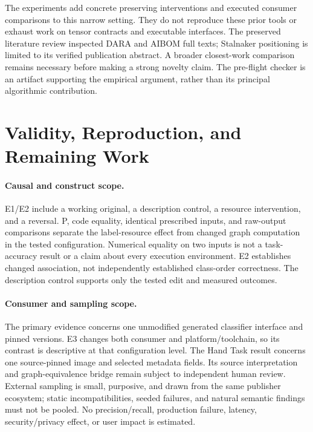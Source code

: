 \documentclass[10pt,twocolumn,letterpaper]{article}
\begin{document}
The experiments add concrete preserving interventions and executed consumer comparisons to this narrow setting. They do not reproduce these prior tools or exhaust work on tensor contracts and executable interfaces. The preserved literature review inspected DARA and AIBOM full texts; Stalnaker positioning is limited to its verified publication abstract. A broader closest-work comparison remains necessary before making a strong novelty claim. The pre-flight checker is an artifact supporting the empirical argument, rather than its principal algorithmic contribution.

\section{Validity, Reproduction, and Remaining Work}
\paragraph{Causal and construct scope.}
E1/E2 include a working original, a description control, a resource intervention, and a reversal. P, code equality, identical prescribed inputs, and raw-output comparisons separate the label-resource effect from changed graph computation in the tested configuration. Numerical equality on two inputs is not a task-accuracy result or a claim about every execution environment. E2 establishes changed association, not independently established class-order correctness. The description control supports only the tested edit and measured outcomes.

\paragraph{Consumer and sampling scope.}
The primary evidence concerns one unmodified generated classifier interface and pinned versions. E3 changes both consumer and platform/toolchain, so its contrast is descriptive at that configuration level. The Hand Task result concerns one source-pinned image and selected metadata fields. Its source interpretation and graph-equivalence bridge remain subject to independent human review. External sampling is small, purposive, and drawn from the same publisher ecosystem; static incompatibilities, seeded failures, and natural semantic findings must not be pooled. No precision/recall, production failure, latency, security/privacy effect, or user impact is estimated.
\end{document}
